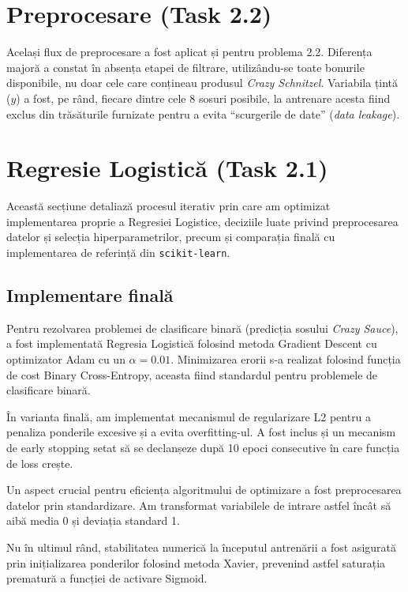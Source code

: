 \documentclass[12pt,a4paper]{article}
\begin{document}
\section{Preprocesare (Task 2.2)}

Același flux de preprocesare a fost aplicat și pentru problema 2.2. Diferența majoră a constat în absența etapei de filtrare, utilizându-se toate bonurile disponibile, nu doar cele care conțineau produsul \textit{Crazy Schnitzel}. Variabila țintă ($y$) a fost, pe rând, fiecare dintre cele 8 sosuri posibile, la antrenare acesta fiind exclus din trăsăturile furnizate pentru a evita ``scurgerile de date'' (\textit{data leakage}).

\section{Regresie Logistică (Task 2.1)}

Această secțiune detaliază procesul iterativ prin care am optimizat implementarea proprie a Regresiei Logistice, deciziile luate privind preprocesarea datelor și selecția hiperparametrilor, precum și comparația finală cu implementarea de referință din \texttt{scikit-learn}.

\subsection{Implementare finală}

Pentru rezolvarea problemei de clasificare binară (predicția sosului \textit{Crazy Sauce}), a fost implementată Regresia Logistică folosind metoda Gradient Descent cu optimizator Adam cu un $\alpha = 0.01$.
Minimizarea erorii s-a realizat folosind funcția de cost Binary Cross-Entropy, aceasta fiind standardul pentru problemele de clasificare binară. 

În varianta finală, am implementat mecanismul de regularizare L2 pentru a penaliza ponderile excesive și a evita overfitting-ul. A fost inclus și un mecanism de early stopping setat să se declanșeze după 10 epoci consecutive în care funcția de loss crește.

Un aspect crucial pentru eficiența algoritmului de optimizare a fost preprocesarea datelor prin standardizare. Am transformat variabilele de intrare astfel încât să aibă media 0 și deviația standard 1. 

Nu în ultimul rând, stabilitatea numerică la începutul antrenării a fost asigurată prin inițializarea ponderilor folosind metoda Xavier, prevenind astfel saturația prematură a funcției de activare Sigmoid.
\end{document}
